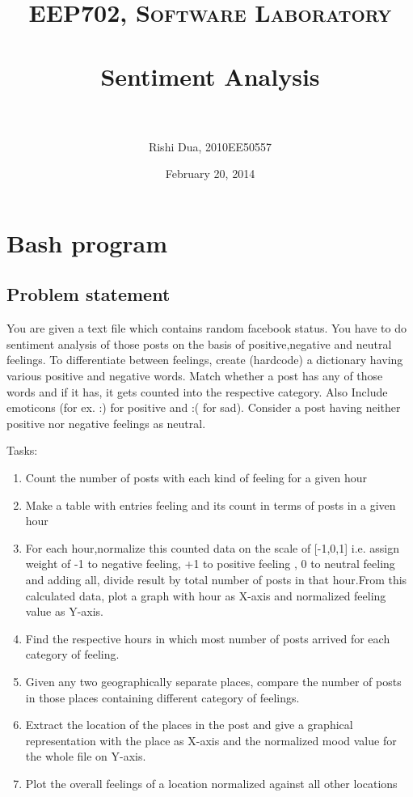 \documentclass[paper=a4, fontsize=11pt]{scrartcl} %
\title{	
\normalfont \normalsize 
\textsc{EEP702, Software Laboratory} \\ [25pt] %
\horrule{0.5pt} \\[0.4cm] %
\huge Sentiment Analysis \\ %
\horrule{2pt} \\[0.5cm] %
}
\author{Rishi Dua, 2010EE50557} %
\date{\normalsize February 20, 2014} %
\numberwithin{equation}{section} %
\numberwithin{figure}{section} %
\numberwithin{table}{section} %
\begin{document}
\maketitle %


\section{Bash program}


\subsection{Problem statement}

You are given a text file which contains random facebook status. You have to do sentiment analysis of those posts on the basis of
positive,negative and neutral feelings. To differentiate between feelings, create (hardcode) a dictionary having various positive and
negative words. Match whether a post has any of those words and if it has, it gets counted into the respective category. Also Include emoticons (for ex. :) for positive and :( for sad). Consider a post having neither positive nor negative feelings as neutral.

Tasks:

\begin {enumerate}
\item Count the number of posts with each kind of feeling for a given hour
\item Make a table with entries feeling and its count in terms of posts in a given hour
\item For each hour,normalize this counted data on the scale of [-1,0,1] i.e. assign weight of -1 to negative feeling, +1 to positive feeling , 0 to neutral feeling and adding all, divide result by total number of posts in that hour.From this calculated data, plot a graph with hour as X-axis and normalized feeling value as Y-axis.
\item Find the respective hours in which most number of posts arrived for each category of feeling.
\item Given any two geographically separate places, compare the number of posts in those places containing different category of feelings.
\item Extract the location of the places in the post and give a graphical representation with the place as X-axis and the normalized mood value for the whole file on Y-axis.
\item Plot the overall feelings of a location normalized against all other locations

\end{enumerate}
\end{document}
